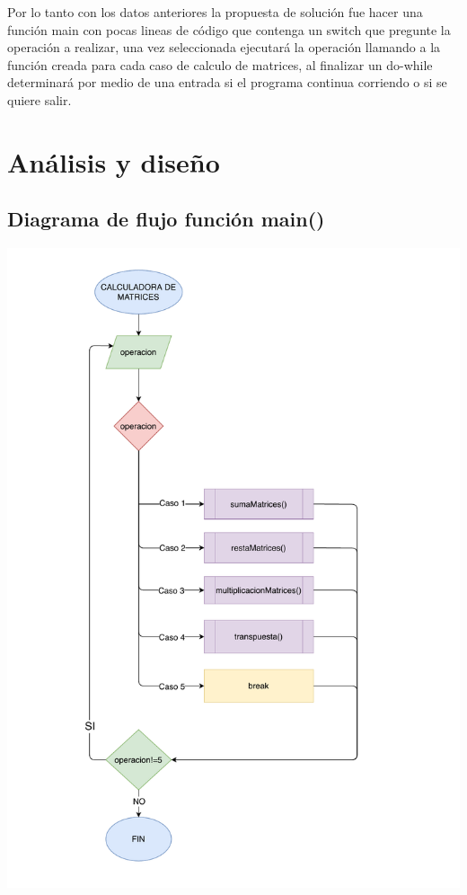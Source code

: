 \documentclass[letter]{revtex4}
\begin{document}
Por lo tanto con los datos anteriores la propuesta de  solución fue hacer una  función main con pocas lineas de código que contenga un switch que pregunte la operación a realizar, una vez seleccionada ejecutará la operación llamando a la función creada para cada caso de calculo de matrices, al finalizar un do-while determinará por medio de una entrada si el programa continua corriendo o si se quiere salir.  

\clearpage
\section{Análisis y diseño}

\subsection{Diagrama de flujo función main()}
\begin{center}
 	\includegraphics[scale=0.8]{Images/Practica2POO.pdf}
 	\label{figura4}
 \end{center}
\end{document}
